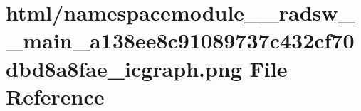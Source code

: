 \hypertarget{namespacemodule____radsw____main__a138ee8c91089737c432cf70dbd8a8fae__icgraph_8png}{}\section{html/namespacemodule\+\_\+\+\_\+radsw\+\_\+\+\_\+main\+\_\+a138ee8c91089737c432cf70dbd8a8fae\+\_\+icgraph.png File Reference}
\label{namespacemodule____radsw____main__a138ee8c91089737c432cf70dbd8a8fae__icgraph_8png}
